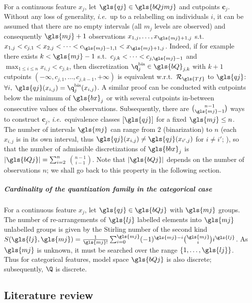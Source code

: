 For a continuous feature $x_j$, let $\gls{qj} \in \gls{bQjmj}$ and cutpoints $\boldsymbol{c}_j$. Without any loss of generality, \textit{i.e.}\ up to a relabelling on individuals $i$, it can be assumed that there are no empty intervals (all $m_j$ levels are observed) and consequently $\gls{mj}+1$ observations $x_{1,j},\dots,x_{\gls{mj}+1,j}$ s.t.\ $x_{1,j} < c_{j,1} < x_{2,j} < \dots < c_{\gls{mj}-1,1} < x_{\gls{mj}+1,j}$. Indeed, if for example there exists $k < \gls{mj} - 1$ s.t.\ $c_{j,k} < \dots < c_{j,\gls{mj}-1}$ and $\max_{1 \leq i \leq n} x_{i,j} < c_{j,k}$, then discretization $\q^{\text{bis}}_j \in \gls{bQ}_{j,k}$ with $k+1$ cutpoints $(-\infty,c_{j,1},\dots,c_{j,k-1},+\infty)$ is equivalent w.r.t.\ $\mathcal{R}_{\gls{Tf}}$ to $\gls{qj}$: $\forall i, \; \gls{qj}(x_{i,j}) = \q^{\text{bis}}_j(x_{i,j})$. A similar proof can be conducted with cutpoints below the minimum of $\gls{bx}_j$ or with several cutpoints in-between consecutive values of the observations. Subsequently, there are $\binom{n-1}{\gls{mj}-1}$ ways to construct $\bm{c}_j$, \textit{i.e.}\ equivalence classes $[\gls{qj}]$ for a fixed $\gls{mj} \leq n$. The number of intervals $\gls{mj}$ can range from $2$ (binarization) to $n$ (each $x_{i,j}$ is in its own interval, thus $\gls{qj}(x_{i,j}) \neq \gls{qj}(x_{i',j})$ for $i \neq i'$; ), so that the number of admissible discretizations of $\gls{bbx}_j$ is $|\gls{bQj}| = \sum_{i=2}^{n}$ ${n-1}\choose{i-1}$. Note that $|\gls{bQj}|$ depends on the number of observations $n$; we shall go back to this property in the following section.


\subparagraph{Cardinality of the quantization family in the categorical case}

For a continuous feature $x_j$, let $\gls{qj} \in \gls{bQj}$ with $\gls{mj}$ groups. The number of re-arrangements of $\gls{lj}$ labelled elements into $\gls{mj}$ unlabelled groups is given by the Stirling number of the second kind $S(\gls{lj},\gls{mj}) = \frac{1}{\gls{mj}!} \sum_{i=0}^{\gls{mj}} (-1)^{\gls{mj}-i} {\gls{mj} \choose i} i^{\gls{lj}}$. As $\gls{mj}$ is unknown, it must be searched over the range $\{1,\dots,\gls{lj}\}$. Thus for categorical features, model space $\gls{bQj}$ is also discrete; subsequently, $\Q$ is discrete.







\subsection{Literature review}

